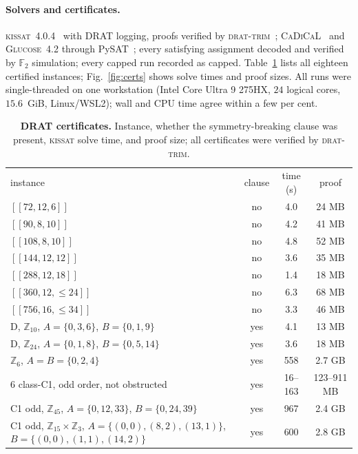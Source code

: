 \documentclass[reprint,twocolumn,superscriptaddress,nofootinbib]{revtex4-2}
\theoremstyle{plain}
\newcommand{\F}{\mathbb{F}_2}
\begin{document}
\paragraph*{Solvers and certificates.}
\textsc{kissat}~4.0.4~\cite{Biere2024Kissat} with DRAT logging, proofs
verified by \textsc{drat-trim}~\cite{Wetzler2014DRAT,HeuleHuntWetzler2013};
\textsc{CaDiCaL}~\cite{Biere2024CaDiCaL} and \textsc{Glucose}~4.2 through
PySAT~\cite{Ignatiev2018PySAT,AudemardSimon2009}; every satisfying
assignment decoded and verified by $\F$ simulation; every capped run
recorded as capped. Table~\ref{tab:certs-full} lists all eighteen certified
instances; Fig.~\ref{fig:certs} shows solve times and proof sizes. All
runs were single-threaded on one workstation (Intel Core Ultra 9 275HX,
$24$ logical cores, $15.6$~GiB, Linux/WSL2); wall and CPU time agree
within a few per cent.

\begin{table}[!t]
\caption{\textbf{DRAT certificates.} Instance, whether the
symmetry-breaking clause was present, \textsc{kissat} solve time, and
proof size; all certificates were verified by \textsc{drat-trim}.}
\label{tab:certs-full}
\centering

\begin{ruledtabular}
\begin{tabular}{lccc}
instance & clause & time (s) & proof \\
\colrule
$[[72,12,6]]$      & no  & 4.0 & 24 MB \\
$[[90,8,10]]$      & no  & 4.2 & 41 MB \\
$[[108,8,10]]$     & no  & 4.8 & 52 MB \\
$[[144,12,12]]$    & no  & 3.6 & 35 MB \\
$[[288,12,18]]$    & no  & 1.4 & 18 MB \\
$[[360,12,\le24]]$ & no  & 6.3 & 68 MB \\
$[[756,16,\le34]]$ & no  & 3.3 & 46 MB \\
D, $\mathbb{Z}_{10}$, $A=\{0,3,6\}$, $B=\{0,1,9\}$
  & yes & 4.1 & 13 MB \\
D, $\mathbb{Z}_{24}$, $A=\{0,1,8\}$, $B=\{0,5,14\}$
  & yes & 3.6 & 18 MB \\
$\mathbb{Z}_6$, $A=B=\{0,2,4\}$
  & yes & 558 & 2.7 GB \\
6 class-C1, odd order, not obstructed
  & yes & 16--163 & 123--911 MB \\
C1 odd, $\mathbb{Z}_{45}$, $A=\{0,12,33\}$, $B=\{0,24,39\}$
  & yes & 967 & 2.4 GB \\
C1 odd, $\mathbb{Z}_{15}\times\mathbb{Z}_3$, $A=\{(0,0),(8,2),(13,1)\}$,
$B=\{(0,0),(1,1),(14,2)\}$
  & yes & 600 & 2.8 GB \\
\end{tabular}
\end{ruledtabular}
\end{table}
\end{document}
